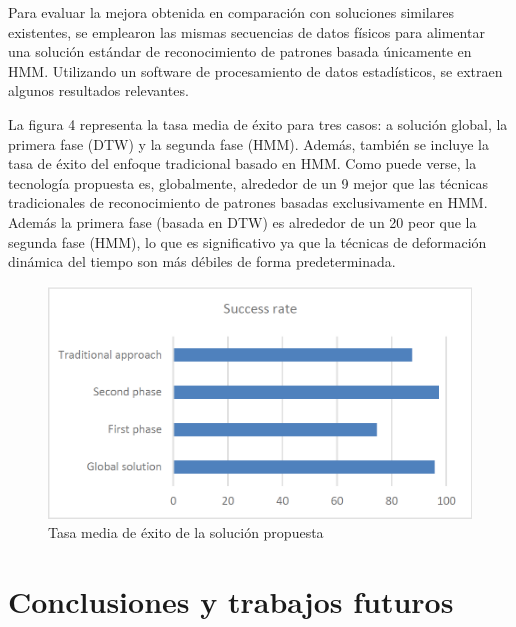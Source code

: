 \documentclass{article}
\begin{document}
Para evaluar la mejora obtenida en comparación con soluciones similares existentes, se emplearon las mismas secuencias de datos físicos para alimentar una solución estándar de reconocimiento de patrones basada únicamente en HMM. Utilizando un software de procesamiento de datos estadísticos, se extraen algunos resultados relevantes.

La figura 4 representa la tasa media de éxito para tres casos: a solución global, la primera fase (DTW) y la segunda fase (HMM). Además, también se incluye la tasa de éxito del enfoque tradicional basado en HMM. Como puede verse, la tecnología propuesta es, globalmente, alrededor de un 9 mejor que las técnicas tradicionales de reconocimiento de patrones basadas exclusivamente en HMM. Además la primera fase (basada en DTW) es alrededor de un 20 peor que la segunda fase (HMM), lo que es significativo ya que la técnicas de deformación dinámica del tiempo son más débiles de forma predeterminada.

\begin{figure}[H]
  \centering
  \includegraphics[scale=0.65]{grafica.png}
  \caption{Tasa media de éxito de la solución propuesta}
\end{figure}

\section{Conclusiones y trabajos futuros}
\end{document}

